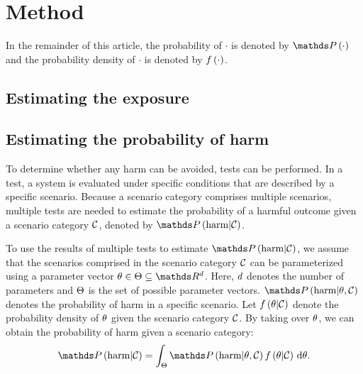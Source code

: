 \section{Method}
\label{sec:method}


In the remainder of this article, the probability of $\cdot$ is denoted by $\probability{\cdot}$ and the probability density of $\cdot$ is denoted by $f\left( \cdot \right)$. 

\subsection{Estimating the exposure}
\label{sec:exposure}

% 



\subsection{Estimating the probability of harm}
\label{sec:controllability}

To determine whether any harm can be avoided, tests can be performed. In a test, a system is evaluated under specific conditions that are described by a specific scenario. Because a scenario category comprises multiple scenarios, multiple tests are needed to estimate the probability of a harmful outcome given a scenario category $\mathcal{C}$, denoted by $\probabilitycond{\harm}{\scenariocategory}$. 

To use the results of multiple tests to estimate $\probabilitycond{\harm}{\scenariocategory}$, we assume that the scenarios comprised in the scenario category $\mathcal{C}$ can be parameterized using a parameter vector $\parvector\in\parspace\subseteq\realnumbers^\pardim$. Here, $d$ denotes the number of parameters and $\Theta$ is the set of possible parameter vectors. $\probabilitycond{\harm}{\parvector,\scenariocategory}$ denotes the probability of harm in a specific scenario. Let $f\left(  \theta | \mathcal{C}  \right)$ denote the probability density of $\theta$ given the scenario category $\mathcal{C}$. By taking  over $\theta$, we can obtain the probability of harm given a scenario category:
\begin{equation}
	\label{eq:prob harm}
	\probabilitycond{\harm}{\scenariocategory} = \int_{\parspace} \probabilitycond{\harm}{\parvector,\scenariocategory} \densitycond{\parvector}{\scenariocategory} \ud\parvector.
\end{equation}

